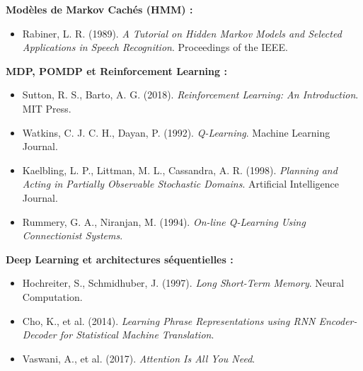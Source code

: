 \documentclass[11pt,a4paper]{article}
\begin{document}
\textbf{Modèles de Markov Cachés (HMM) :}

\begin{itemize}

\item Rabiner, L. R. (1989).
\textit{A Tutorial on Hidden Markov Models and Selected Applications in Speech Recognition}.
Proceedings of the IEEE.

\end{itemize}

\vspace{0.3cm}

\textbf{MDP, POMDP et Reinforcement Learning :}

\begin{itemize}

\item Sutton, R. S., Barto, A. G. (2018).
\textit{Reinforcement Learning: An Introduction}.
MIT Press.

\item Watkins, C. J. C. H., Dayan, P. (1992).
\textit{Q-Learning}.
Machine Learning Journal.

\item Kaelbling, L. P., Littman, M. L., Cassandra, A. R. (1998).
\textit{Planning and Acting in Partially Observable Stochastic Domains}.
Artificial Intelligence Journal.

\item Rummery, G. A., Niranjan, M. (1994).
\textit{On-line Q-Learning Using Connectionist Systems}.

\end{itemize}

\vspace{0.3cm}

\textbf{Deep Learning et architectures séquentielles :}

\begin{itemize}

\item Hochreiter, S., Schmidhuber, J. (1997).
\textit{Long Short-Term Memory}.
Neural Computation.

\item Cho, K., et al. (2014).
\textit{Learning Phrase Representations using RNN Encoder-Decoder for Statistical Machine Translation}.

\item Vaswani, A., et al. (2017).
\textit{Attention Is All You Need}.

\end{itemize}
% 
\end{document}
